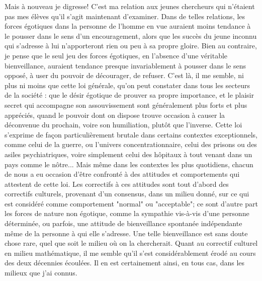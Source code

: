 Mais à nouveau je digresse! C'est ma relation aux jeunes chercheurs qui n'étaient pas mes élèves qu'il s'agit maintenant d'examiner. Dans de telles relations, les forces égotiques dans la personne de l'homme en vue auraient moins tendance à le pousser dans le sens d'un encouragement, alors que les succès du jeune inconnu qui s'adresse à lui n'apporteront rien ou peu à sa propre gloire. Bien au contraire, je pense que le seul jeu des forces égotiques, en l'absence d'une véritable bienveillance, auraient tendance presque invariablement à pousser dans le sens opposé, à user du pouvoir de décourager, de refuser. C'est là, il me semble, ni plus ni moins que cette loi générale, qu'on peut constater dans tous les secteurs de la société : que le désir égotique de prouver sa propre importance, et le plaisir secret qui accompagne son assouvissement sont généralement plus forts et plus appréciés, quand le pouvoir dont on dispose trouve occasion à causer la déconvenue du prochain, voire son humiliation, plutôt que l'inverse. Cette loi s'exprime de façon particulièrement brutale dans certains contextes exceptionnels, comme celui de la guerre, ou l'univers concentrationnaire, celui des prisons ou des asiles psychiatriques, voire simplement celui des hôpitaux à tout venant dans un pays comme le nôtre... Mais même dans les contextes les plus quotidiens, chacun de nous a eu occasion d'être confronté à des attitudes et comportements qui attestent de cette loi. Les correctifs à ces attitudes sont tout d'abord des correctifs culturels, provenant d'un consensus, dans un milieu donné, sur ce qui est considéré comme comportement "normal" ou "acceptable"; ce sont d'autre part les forces de nature non égotique, comme la sympathie vis-à-vis d'une personne déterminée, ou parfois, une attitude de bienveillance spontanée indépendante même de la personne à qui elle s'adresse. Une telle bienveillance est sans doute chose rare, quel que soit le milieu où on la chercherait. Quant au correctif culturel en milieu mathématique, il me semble qu'il s'est considérablement érodé au cours des deux décennies écoulées. Il en est certainement ainsi, en tous cas, dans les milieux que j'ai connus.

